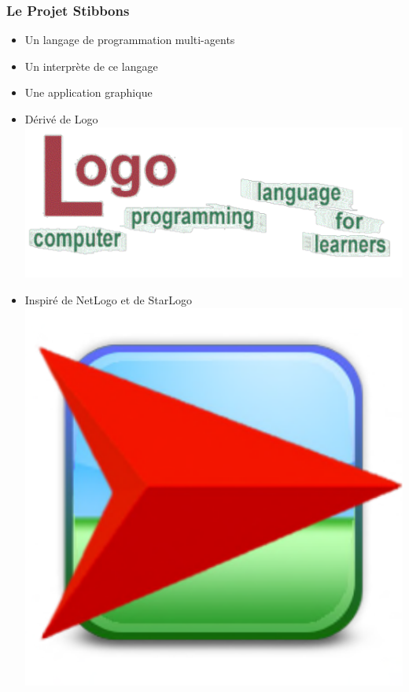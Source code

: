 \begin{frame}
\frametitle{Le Projet Stibbons}
\begin{itemize}
	\item Un langage de programmation multi-agents
	\item Un interprète de ce langage
	\item Une application graphique
\end{itemize}
\end{frame}

\begin{frame}
\begin{itemize}
	\item Dérivé de Logo
		\includegraphics[scale=0.4]{doc/Presentation/image/logo.pdf}
	\item Inspiré de NetLogo et de StarLogo
		\includegraphics[scale=0.3]{doc/Presentation/image/netlogo.pdf}

\end{itemize}
\end{frame}

